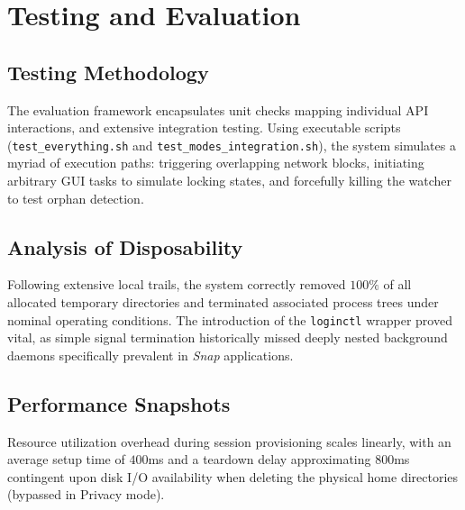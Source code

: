 \chapter{Testing and Evaluation}

\section{Testing Methodology}
The evaluation framework encapsulates unit checks mapping individual API interactions, and extensive integration testing. Using executable scripts (\texttt{test\_everything.sh} and \texttt{test\_modes\_integration.sh}), the system simulates a myriad of execution paths: triggering overlapping network blocks, initiating arbitrary GUI tasks to simulate locking states, and forcefully killing the watcher to test orphan detection. 

\section{Analysis of Disposability}
Following extensive local trails, the system correctly removed $100\%$ of all allocated temporary directories and terminated associated process trees under nominal operating conditions. The introduction of the \texttt{loginctl} wrapper proved vital, as simple signal termination historically missed deeply nested background daemons specifically prevalent in \textit{Snap} applications.

\section{Performance Snapshots}
Resource utilization overhead during session provisioning scales linearly, with an average setup time of $400$ms and a teardown delay approximating $800$ms contingent upon disk I/O availability when deleting the physical home directories (bypassed in Privacy mode).
